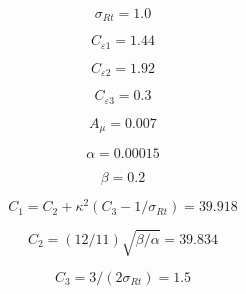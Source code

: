 {\newpage\clearpage
{}%
\begin{displaymath}
\sigma_{Rt} = 1.0
\end{displaymath}%
\lthtmldisplayZ
\lthtmlcheckvsize\clearpage}

{\newpage\clearpage
{}%
\begin{displaymath}
C_{\varepsilon 1} = 1.44
\end{displaymath}%
\lthtmldisplayZ
\lthtmlcheckvsize\clearpage}

{\newpage\clearpage
{}%
\begin{displaymath}
C_{\varepsilon 2} = 1.92
\end{displaymath}%
\lthtmldisplayZ
\lthtmlcheckvsize\clearpage}

{\newpage\clearpage
{}%
\begin{displaymath}
C_{\varepsilon 3} = 0.3
\end{displaymath}%
\lthtmldisplayZ
\lthtmlcheckvsize\clearpage}

{\newpage\clearpage
{}%
\begin{displaymath}
A_{\mu} = 0.007
\end{displaymath}%
\lthtmldisplayZ
\lthtmlcheckvsize\clearpage}

{\newpage\clearpage
{}%
\begin{displaymath}
\alpha = 0.00015
\end{displaymath}%
\lthtmldisplayZ
\lthtmlcheckvsize\clearpage}

{\newpage\clearpage
{}%
\begin{displaymath}
\beta = 0.2
\end{displaymath}%
\lthtmldisplayZ
\lthtmlcheckvsize\clearpage}

{\newpage\clearpage
{}%
\begin{displaymath}
C_1 = C_2 + \kappa^2(C_3 - 1/\sigma_{Rt}) = 39.918
\end{displaymath}%
\lthtmldisplayZ
\lthtmlcheckvsize\clearpage}

{\newpage\clearpage
{}%
\begin{displaymath}
C_2 = (12/11) \sqrt{\beta/\alpha} = 39.834
\end{displaymath}%
\lthtmldisplayZ
\lthtmlcheckvsize\clearpage}

{\newpage\clearpage
{}%
\begin{displaymath}
C_3 = 3/(2 \sigma_{Rt}) = 1.5
\end{displaymath}%
\lthtmldisplayZ
\lthtmlcheckvsize\clearpage}

